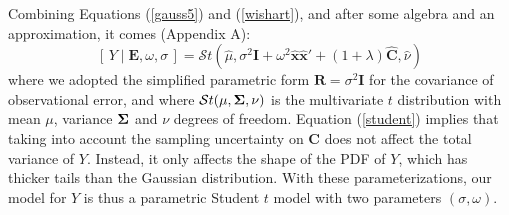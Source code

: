 \documentclass[12pt]{article}
\newcommand{\Sig}{\mbox{\boldmath \(\Sigma\)}}
\newcommand{\x}{\boldsymbol{x}}
\newcommand{\E}{\mathbf{E}}
\begin{document}
Combining Equations (\ref{gauss5}) and (\ref{wishart}), and after some algebra and an approximation, it comes (Appendix A):
\begin{equation} 
\label{student}
\left[\,Y\mid \E,\omega,\sigma\,\right] = \mathcal{S}t(\widehat{\mu},\sigma^2 \mathbf I+\omega^2\widehat{\x}\widehat{\x}'+(1+\lambda)\widehat{\mathbf{C}},\widehat{\nu})
\end{equation}
where we adopted the simplified parametric form $\mathbf R=\sigma^2\mathbf I$ for the covariance of observational error, and where $\mathcal{S}t(\mu,\Sig,\nu)$ is the multivariate $t$ distribution with mean $\mu$, variance $\Sig$ and $\nu$ degrees of freedom. Equation (\ref{student}) implies that taking into account the sampling uncertainty on $\mathbf C$ does not affect the total variance of $Y$. Instead, it only affects the shape of the PDF of $Y$, which has thicker tails than the Gaussian distribution. With these parameterizations, our model for $Y$ is thus a parametric Student $t$ model with two parameters $(\sigma, \omega)$. 
\end{document}
